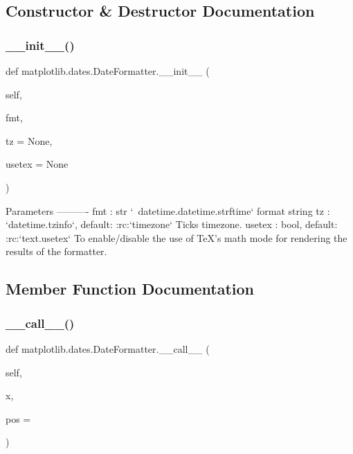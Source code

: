 \subsection{Constructor \& Destructor Documentation}
\mbox{\label{classmatplotlib_1_1dates_1_1DateFormatter_ae4cd221d75f6aac94f1304fcb96c070e}} 
\subsubsection{\texorpdfstring{\+\_\+\+\_\+init\+\_\+\+\_\+()}{\_\_init\_\_()}}
{\footnotesize\ttfamily def matplotlib.\+dates.\+Date\+Formatter.\+\_\+\+\_\+init\+\_\+\+\_\+ (\begin{DoxyParamCaption}\item[{}]{self,  }\item[{}]{fmt,  }\item[{}]{tz = {\ttfamily None},  }\item[{}]{usetex = {\ttfamily None} }\end{DoxyParamCaption})}

\begin{DoxyVerb}Parameters
----------
fmt : str
    `~datetime.datetime.strftime` format string
tz : `datetime.tzinfo`, default: :rc:`timezone`
    Ticks timezone.
usetex : bool, default: :rc:`text.usetex`
    To enable/disable the use of TeX's math mode for rendering the
    results of the formatter.
\end{DoxyVerb}
 

\subsection{Member Function Documentation}
\mbox{\label{classmatplotlib_1_1dates_1_1DateFormatter_a3dbcd2731367333668a6f5e1aa464026}} 
\subsubsection{\texorpdfstring{\+\_\+\+\_\+call\+\_\+\+\_\+()}{\_\_call\_\_()}}
{\footnotesize\ttfamily def matplotlib.\+dates.\+Date\+Formatter.\+\_\+\+\_\+call\+\_\+\+\_\+ (\begin{DoxyParamCaption}\item[{}]{self,  }\item[{}]{x,  }\item[{}]{pos = {} }\end{DoxyParamCaption})}

